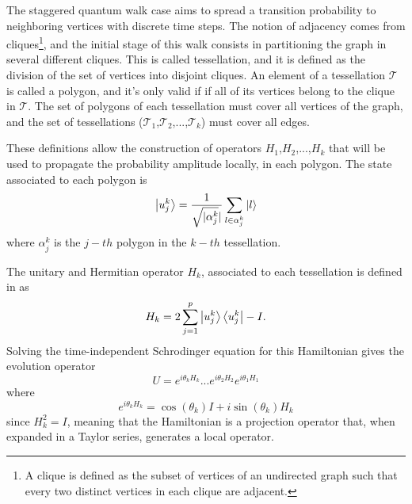 \documentclass[../../dissertation.tex]{subfiles}
\begin{document}
The staggered quantum walk case aims to spread a transition probability to
neighboring vertices with discrete time steps. The notion of adjacency comes
from cliques\footnote{A clique is defined as the subset of vertices of an
	undirected graph such that every two distinct vertices in each clique
are adjacent.}, and the initial stage of this walk consists in partitioning the
graph in several different cliques. This is called tessellation, and it is
defined as the division of the set of vertices into disjoint cliques. An
element of a tessellation $\mathscr{T}$ is called a polygon, and it's only
valid if if all of its vertices belong to the clique in $\mathscr{T}$. The set
of polygons of each tessellation must cover all vertices of the graph, and the
set of tessellations
($\mathscr{T}_{1}$,$\mathscr{T}_{2}$,...,$\mathscr{T}_{k}$) must cover all
edges.\par 

These definitions allow the construction of operators $H_1$,$H_2$,...,$H_k$
that will be used to propagate the probability amplitude locally, in each
polygon. The state associated to each polygon is
\begin{equation}
	\ket{u_{j}^{k}} = \frac{1}{\sqrt{\mathopen|\alpha_{j}^{k}}\mathclose|}\sum_{l\in\alpha_{j}^{k}}\ket{l}
\end{equation}
where $\alpha_{j}^{k}$ is the $j-th$ polygon in the $k-th$ tessellation.\par

The unitary and Hermitian operator $H_k$, associated to each tessellation is
defined in \cite{portugal2017b} as
\begin{equation}
	H_k = 2\sum_{j=1}^{p}\ket{u_{j}^{k}}\bra{u_{j}^{k}} - I.
	\label{eq:StagHamil}
\end{equation}
Solving the time-independent Schrodinger equation for this Hamiltonian gives
the evolution operator 
\begin{equation}
	U = e^{i\theta_{k}H_{k}}...e^{i\theta_{2}H_{2}}e^{i\theta_{1}H_{1}}
	\label{eq:stagWalkUnmodOp}
\end{equation}
where
\begin{equation}
	e^{i\theta_{k}H_{k}} = \cos{(\theta_k)}I + i\sin{(\theta_k)}H_k
\end{equation}
since $H_k^2 = I$, meaning that the Hamiltonian is a projection operator that,
when expanded in a Taylor series, generates a local operator.\par
\end{document}
